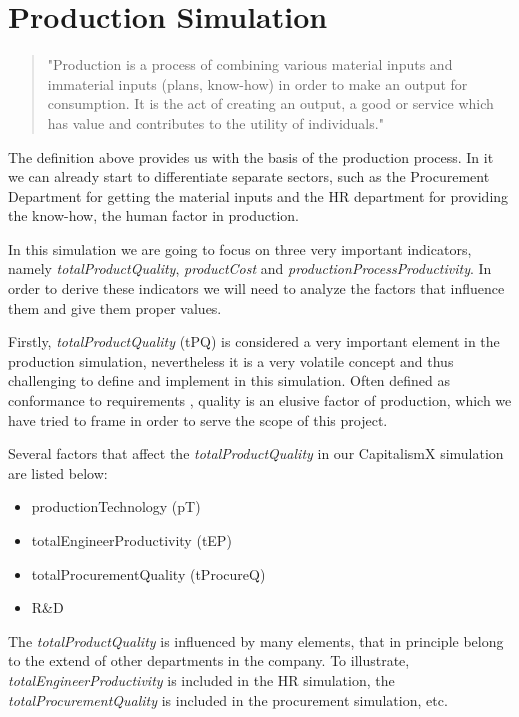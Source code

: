 \section{Production Simulation}
\label{sec:productionSim}
 \begin{quotation}
"Production is a process of combining various material inputs and immaterial inputs (plans, know-how) in order to make an output for consumption. It is the act of creating an output, a good or service which has value and contributes to the utility of individuals."\cite{noauthor_production_2019}
 \end{quotation}
The definition above provides us with the basis of the production process. In it we can already start to differentiate separate sectors, such as the Procurement Department for getting the material inputs and the HR department for providing the know-how, the human factor in production. 

In this simulation we are going to focus on three very important indicators, namely \textit{totalProductQuality}, \textit{productCost} and \textit{productionProcessProductivity}. In order to derive these indicators we will need to analyze the factors that influence them and give them proper values. 

Firstly, \textit{totalProductQuality} (\gls{tPQ}) is considered a very important element in the production simulation, nevertheless it is a very volatile concept and thus challenging to define and implement in this simulation. Often defined as conformance to requirements \cite{crosby_quality_1979}, quality is an elusive factor of production, which we have tried to frame in order to serve the scope of this project.

 Several factors that affect the \textit{totalProductQuality} in our CapitalismX simulation are listed below:
\begin{itemize}
\item productionTechnology (\gls{pT})
\item totalEngineerProductivity (\gls{tEP}) 
\item totalProcurementQuality (tProcureQ)
\item R\&D
\end{itemize}
The \textit{totalProductQuality} is influenced by many elements, that in principle belong to the extend of other departments in the company. To illustrate, \textit{totalEngineerProductivity} is included in the HR simulation, the \textit{totalProcurementQuality} is included in the procurement simulation, etc. 

